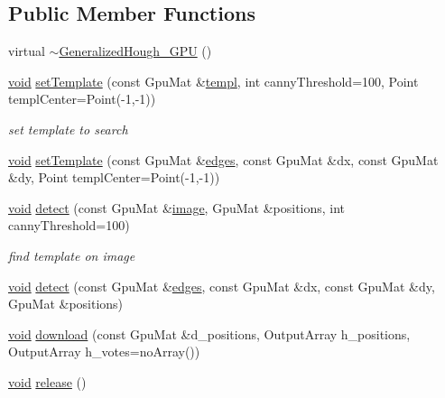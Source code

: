 \subsection*{Public Member Functions}
\begin{DoxyCompactItemize}
\item 
virtual \hyperlink{classcv_1_1gpu_1_1GeneralizedHough__GPU_a0709918b7424a09d82460cc385dceedf}{$\sim$\-Generalized\-Hough\-\_\-\-G\-P\-U} ()
\item 
\hyperlink{legacy_8hpp_a8bb47f092d473522721002c86c13b94e}{void} \hyperlink{classcv_1_1gpu_1_1GeneralizedHough__GPU_aa7671dfd98724609e511ca3c7c5f4b59}{set\-Template} (const Gpu\-Mat \&\hyperlink{imgproc__c_8h_a3dda0ce9b269462404396ce3e9eedf00}{templ}, int canny\-Threshold=100, Point templ\-Center=Point(-\/1,-\/1))
\begin{DoxyCompactList}\small\item\em set template to search \end{DoxyCompactList}\item 
\hyperlink{legacy_8hpp_a8bb47f092d473522721002c86c13b94e}{void} \hyperlink{classcv_1_1gpu_1_1GeneralizedHough__GPU_a4fe51ec07dc6f5abc1757c9f1d327902}{set\-Template} (const Gpu\-Mat \&\hyperlink{imgproc__c_8h_a0934986249e7ba69309a154af3260f89}{edges}, const Gpu\-Mat \&dx, const Gpu\-Mat \&dy, Point templ\-Center=Point(-\/1,-\/1))
\item 
\hyperlink{legacy_8hpp_a8bb47f092d473522721002c86c13b94e}{void} \hyperlink{classcv_1_1gpu_1_1GeneralizedHough__GPU_aa36e59610b15d32242c5dc13ba79edfb}{detect} (const Gpu\-Mat \&\hyperlink{legacy_8hpp_ad62b16ab219ae2483e8a3d921c44cc97}{image}, Gpu\-Mat \&positions, int canny\-Threshold=100)
\begin{DoxyCompactList}\small\item\em find template on image \end{DoxyCompactList}\item 
\hyperlink{legacy_8hpp_a8bb47f092d473522721002c86c13b94e}{void} \hyperlink{classcv_1_1gpu_1_1GeneralizedHough__GPU_a24d3fa308ef3835cfbfcc99f5be4f579}{detect} (const Gpu\-Mat \&\hyperlink{imgproc__c_8h_a0934986249e7ba69309a154af3260f89}{edges}, const Gpu\-Mat \&dx, const Gpu\-Mat \&dy, Gpu\-Mat \&positions)
\item 
\hyperlink{legacy_8hpp_a8bb47f092d473522721002c86c13b94e}{void} \hyperlink{classcv_1_1gpu_1_1GeneralizedHough__GPU_a3c2d5f4e06d4745b1eeb99c308bd79e5}{download} (const Gpu\-Mat \&d\-\_\-positions, Output\-Array h\-\_\-positions, Output\-Array h\-\_\-votes=no\-Array())
\item 
\hyperlink{legacy_8hpp_a8bb47f092d473522721002c86c13b94e}{void} \hyperlink{classcv_1_1gpu_1_1GeneralizedHough__GPU_af82bc322b97018b937b813589dd24fb5}{release} ()
\end{DoxyCompactItemize}

